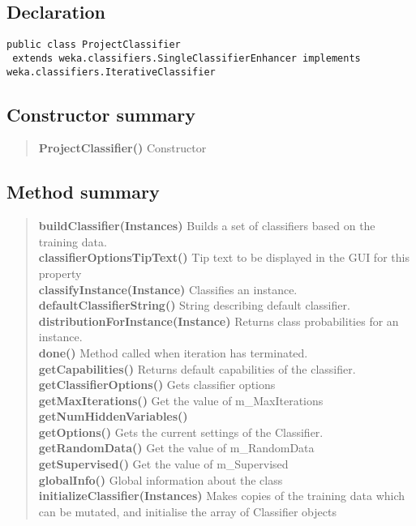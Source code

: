 \documentclass[11pt,a4paper]{report}
\begin{document}
{{{\subsection{Declaration}{
\begin{lstlisting}[frame=none]
public class ProjectClassifier
 extends weka.classifiers.SingleClassifierEnhancer implements weka.classifiers.IterativeClassifier\end{lstlisting}
\subsection{Constructor summary}{
\begin{verse}
{\bf ProjectClassifier()} Constructor\\
\end{verse}
}
\subsection{Method summary}{
\begin{verse}
{\bf buildClassifier(Instances)} Builds a set of classifiers based on the training data.\\
{\bf classifierOptionsTipText()} Tip text to be displayed in the GUI for this property\\
{\bf classifyInstance(Instance)} Classifies an instance.\\
{\bf defaultClassifierString()} String describing default classifier.\\
{\bf distributionForInstance(Instance)} Returns class probabilities for an instance.\\
{\bf done()} Method called when iteration has terminated.\\
{\bf getCapabilities()} Returns default capabilities of the classifier.\\
{\bf getClassifierOptions()} Gets classifier options\\
{\bf getMaxIterations()} Get the value of m\_MaxIterations\\
{\bf getNumHiddenVariables()} \\
{\bf getOptions()} Gets the current settings of the Classifier.\\
{\bf getRandomData()} Get the value of m\_RandomData\\
{\bf getSupervised()} Get the value of m\_Supervised\\
{\bf globalInfo()} Global information about the class\\
{\bf initializeClassifier(Instances)} Makes copies of the training data which can be mutated, and initialise the array of Classifier objects\\

\end{verse}}}}}}
\end{document}

